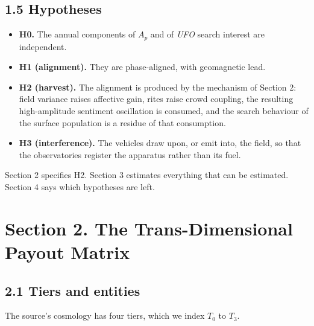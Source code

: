 \documentclass[
  10pt,
  a4paper,
]{article}
\providecommand{\tightlist}{%
  \setlength{\itemsep}{0pt}\setlength{\parskip}{0pt}}
\begin{document}
\hypertarget{hypotheses}{%
\subsection{1.5 Hypotheses}\label{hypotheses}}

\begin{itemize}
\tightlist
\item
  \textbf{H0.} The annual components of \(A_p\) and of \emph{UFO} search
  interest are independent.
\item
  \textbf{H1 (alignment).} They are phase-aligned, with geomagnetic
  lead.
\item
  \textbf{H2 (harvest).} The alignment is produced by the mechanism of
  Section 2: field variance raises affective gain, rites raise crowd
  coupling, the resulting high-amplitude sentiment oscillation is
  consumed, and the search behaviour of the surface population is a
  residue of that consumption.
\item
  \textbf{H3 (interference).} The vehicles draw upon, or emit into, the
  field, so that the observatories register the apparatus rather than
  its fuel.
\end{itemize}

Section 2 specifies H2. Section 3 estimates everything that can be
estimated. Section 4 says which hypotheses are left.

\hypertarget{section-2.-the-trans-dimensional-payout-matrix}{%
\section{Section 2. The Trans-Dimensional Payout
Matrix}\label{section-2.-the-trans-dimensional-payout-matrix}}

\hypertarget{tiers-and-entities}{%
\subsection{2.1 Tiers and entities}\label{tiers-and-entities}}

The source's cosmology has four tiers, which we index \(T_0\) to
\(T_3\).
\end{document}
